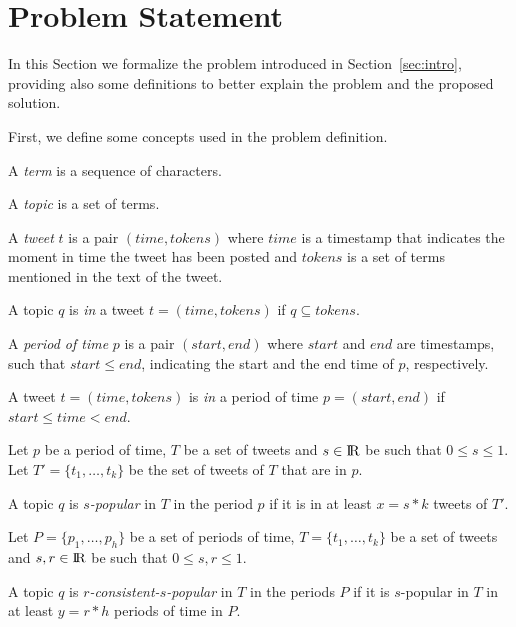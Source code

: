 \section{Problem Statement}
\label{sec:ps}
In this Section we formalize the problem introduced in Section~\ref{sec:intro}, 
providing also some definitions to better explain the problem and the proposed solution.

First, we define some concepts used in the problem definition.
\begin{definition}
    A \emph{term} is a sequence of characters.
\end{definition}
\begin{definition}
    A \emph{topic} is a set of terms.
\end{definition}
\begin{definition}
    A \emph{tweet} $t$ is a pair $(\mathit{time}, \mathit{tokens})$ where
    $\mathit{time}$ is a timestamp that indicates the moment in time the 
    tweet has been posted and $\mathit{tokens}$ is a set of terms mentioned
    in the text of the tweet.
\end{definition}
\begin{definition}
    A topic $q$ is \emph{in} a tweet $t = (\mathit{time}, \mathit{tokens})$ if 
    $\mathit{q} \subseteq \mathit{tokens}$.
\end{definition}
\begin{definition}
    A \emph{period of time} $p$ is a pair $(\mathit{start}, \mathit{end})$ where
    $\mathit{start}$ and $\mathit{end}$ are timestamps, such that 
    $\mathit{start} \leq \mathit{end}$, indicating the start and 
    the end time of $p$, respectively.
\end{definition}
\begin{definition}
    A tweet $t = (\mathit{time}, \mathit{tokens})$ is \emph{in} a period of 
    time $p = (\mathit{start}, \mathit{end})$ if 
    $\mathit{start} \leq time < \mathit{end}$.
\end{definition}
\begin{definition}
   Let $p$ be a period of time, $T$ be a set of tweets and $s \in \rm I\!R$ be
   such that $0 \leq s \leq 1$.
    Let
   $T' = \{t_1, \dots, t_k\}$ be the set of tweets of $T$ that are in $p$. 

   A topic $q$ is $s$\emph{-popular} in $T$ in the period $p$ if it is in at least
   $x = s * k$ tweets of $T'$.
\end{definition}
\begin{definition}
    Let $P = \{p_1, \dots, p_h\}$ be a set of periods of time, 
    $T = \{t_1, \dots, t_k\}$ be a set of tweets and
    $s, r \in \rm I\!R$ be such that $0 \leq s, r \leq 1$.

    A topic $q$ is $r$\emph{-consistent-}$s$\emph{-popular} in $T$ in the periods $P$ 
    if it is $s$-popular in $T$ in at least $y = r * h$ periods of time in $P$.
 \end{definition}

